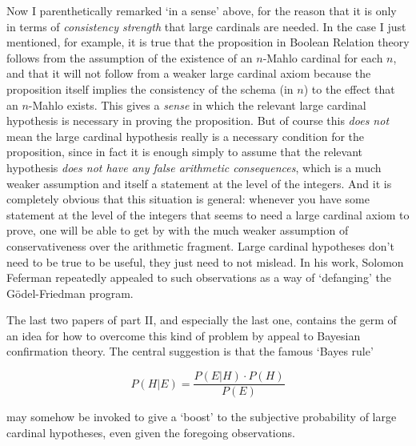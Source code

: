 \documentclass{amsart}
\theoremstyle{definition}
\begin{document}
Now I parenthetically remarked `in a sense' above, for the reason that
it is only in terms of \emph{consistency strength} that large cardinals are needed. 
In the case I just mentioned, for example, 
it is true that the proposition in Boolean Relation theory 
follows from the assumption of the existence of an $n$-Mahlo cardinal for each $n$, 
and that it will not follow from a weaker large cardinal axiom because the proposition 
itself implies the consistency of the schema (in $n$) to the effect that an $n$-Mahlo 
exists. This gives a \emph{sense} in which the relevant large cardinal hypothesis is necessary
in proving the proposition.  But 
of course this \emph{does not} mean the large cardinal hypothesis really is
a necessary condition for the proposition, since in fact it is 
enough simply to assume that the relevant hypothesis
\emph{does not have any false arithmetic consequences}, which is a much weaker 
assumption and itself a statement at the level of the integers. 
And it is completely obvious that this situation is general: whenever you have 
some statement at the level of the integers that seems to need a large cardinal 
axiom to prove, one will be able to get by with the much weaker assumption of 
conservativeness over the arithmetic fragment. Large cardinal hypotheses don't need
to be true to be useful, they just need to not mislead.
In his work, Solomon Feferman repeatedly appealed to such observations 
as a way of `defanging' the G\"odel-Friedman program.

The last two papers of part II, and especially the last one, contains the germ
of an idea for how to overcome this kind of problem by appeal to Bayesian 
confirmation theory. The central suggestion is that the famous `Bayes rule'

\begin{equation}
P(H|E) = \frac{P(E|H)\cdot P(H)}{P(E)}
\end{equation}

may somehow be invoked to give a `boost' to the subjective probability 
of large cardinal hypotheses, even given the foregoing observations.
\end{document}
